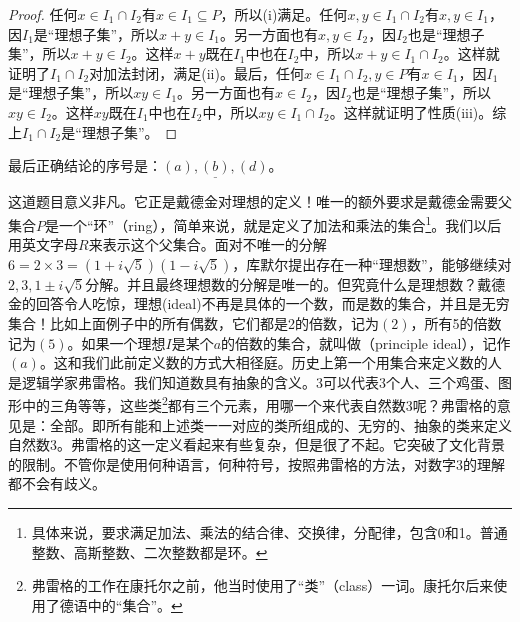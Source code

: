 \documentclass[b5paper]{ctexart}
\begin{document}
\begin{proof}
任何$x \in I_1 \cap I_2$有$x \in I_1 \subseteq P$，所以(i)满足。任何$x, y \in I_1 \cap I_2$有$x, y \in I_1$，因$I_1$是“理想子集”，所以$x + y \in I_1$。另一方面也有$x, y \in I_2$，因$I_2$也是“理想子集”，所以$x + y \in I_2$。这样$x + y$既在$I_1$中也在$I_2$中，所以$x + y \in I_1 \cap I_2$。这样就证明了$I_1 \cap I_2$对加法封闭，满足(ii)。最后，任何$x \in I_1 \cap I_2, y \in P$有$x \in I_1$，因$I_1$是“理想子集”，所以$xy \in I_1$。另一方面也有$x \in I_2$，因$I_2$也是“理想子集”，所以$xy \in I_2$。这样$xy$既在$I_1$中也在$I_2$中，所以$xy \in I_1 \cap I_2$。这样就证明了性质(iii)。综上$I_1 \cap I_2$是“理想子集”。
\end{proof}

最后正确结论的序号是：$\underline{(a), (b), (d)}$。

这道题目意义非凡。它正是戴德金对理想的定义！唯一的额外要求是戴德金需要父集合$P$是一个“环”（ring），简单来说，就是定义了加法和乘法的集合\footnote{具体来说，要求满足加法、乘法的结合律、交换律，分配律，包含0和1。普通整数、高斯整数、二次整数都是环。}。我们以后用英文字母$R$来表示这个父集合。面对不唯一的分解$6 = 2 \times 3 = (1 + i\sqrt{5})(1 - i\sqrt{5})$，库默尔提出存在一种“理想数”，能够继续对$2, 3, 1 \pm i\sqrt{5}$分解。并且最终理想数的分解是唯一的。但究竟什么是理想数？戴德金的回答令人吃惊，理想(ideal)不再是具体的一个数，而是数的集合，并且是无穷集合！比如上面例子中的所有偶数，它们都是2的倍数，记为$(2)$，所有5的倍数记为$(5)$。如果一个理想$I$是某个$a$的倍数的集合，就叫做（principle ideal），记作$(a)$。这和我们此前定义数的方式大相径庭。历史上第一个用集合来定义数的人是逻辑学家弗雷格。我们知道数具有抽象的含义。3可以代表3个人、三个鸡蛋、图形中的三角等等，这些类\footnote{弗雷格的工作在康托尔之前，他当时使用了“类”（class）一词。康托尔后来使用了德语中的“集合”。}都有三个元素，用哪一个来代表自然数3呢？弗雷格的意见是：全部。即所有能和上述类一一对应的类所组成的、无穷的、抽象的类来定义自然数3。弗雷格的这一定义看起来有些复杂，但是很了不起。它突破了文化背景的限制。不管你是使用何种语言，何种符号，按照弗雷格的方法，对数字3的理解都不会有歧义。
\end{document}
